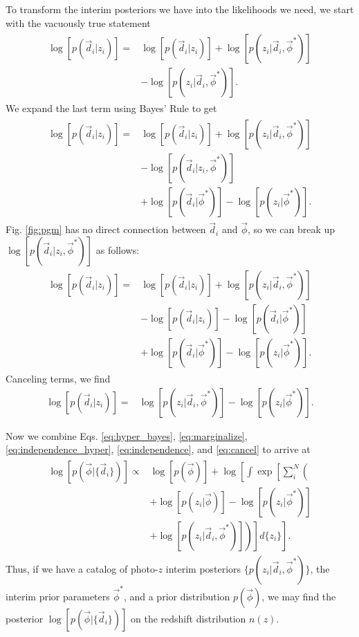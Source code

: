 \documentclass[iop]{emulateapj}
\begin{document}
To transform the interim posteriors we have into the likelihoods we need, we 
start with the vacuously true statement
\begin{align}
\begin{split}
\label{eq:unity}
\log[p(\vec{d}_{i} | z_{i})] =& \log[p(\vec{d}_{i} | z_{i})] + \log[p(z_{i} | 
\vec{d}_{i}, \vec{\phi}^{*})]\\
& - \log[p(z_{i} | \vec{d}_{i}, \vec{\phi}^{*})].
\end{split}
\end{align}
We expand the last term using Bayes' Rule to get
\begin{align}
\begin{split}
\label{eq:bayes}
\log[p(\vec{d}_{i} | z_{i})] =& \log[p(\vec{d}_{i} | z_{i})] + \log[p(z_{i} | 
\vec{d}_{i}, \vec{\phi}^{*})]\\
& - \log[p(\vec{d}_{i} | z_{i}, \vec{\phi}^{*})]\\
& + \log[p(\vec{d}_{i} | \vec{\phi}^{*})] - \log[p(z_{i} | \vec{\phi}^{*})].
\end{split}
\end{align}
Fig. \ref{fig:pgm} has no direct connection between $\vec{d}_{i}$ and 
$\vec{\phi}$, so we can break up $\log[p(\vec{d}_{i} | z_{i}, \vec{\phi}^{*})]$ 
as follows:
\begin{align}
\begin{split}
\label{eq:split}
\log[p(\vec{d}_{i} | z_{i})] =& \log[p(\vec{d}_{i} | z_{i})] + \log[p(z_{i} | 
\vec{d}_{i}, \vec{\phi}^{*})]\\
& - \log[p(\vec{d}_{i} | z_{i})] - \log[p(\vec{d}_{i} | \vec{\phi}^{*})]\\
& + \log[p(\vec{d}_{i} | \vec{\phi}^{*})] - \log[p(z_{i} | \vec{\phi}^{*})].
\end{split}
\end{align}
Canceling terms, we find
\begin{align}
\label{eq:cancel}
\log[p(\vec{d}_{i} | z_{i})] =& \log[p(z_{i} | \vec{d}_{i}, \vec{\phi}^{*})] - 
\log[p(z_{i} | \vec{\phi}^{*})].
\end{align}

Now we combine Eqs. \ref{eq:hyper_bayes}, \ref{eq:marginalize}, 
\ref{eq:independence_hyper}, \ref{eq:independence}, and \ref{eq:cancel} to 
arrive at 
\begin{align}
\begin{split}
\label{eq:final}
\log[p(\vec{\phi} | \{\vec{d}_{i}\})] \propto& \log[p(\vec{\phi})] + 
\log\left[\int \exp\left[\sum_{i}^{N} \left(\right.\right.\right.\\
& \left.\left.\left. + \log[p(z_{i} | \vec{\phi})] - \log[p(z_{i} | 
\vec{\phi}^{*})]\right.\right.\right.\\
& \left.\left.\left. + \log[p(z_{i} | \vec{d}_{i}, \vec{\phi}^{*})]
\right)\right] d\{z_{i}\}\right].
\end{split}
\end{align}
Thus, if we have a catalog of photo-$z$ interim posteriors $\{p(z_{i} | 
\vec{d}_{i}, \vec{\phi}^{*})\}$, the interim prior parameters $\vec{\phi}^{*}$, 
and a prior distribution $p(\vec{\phi})$, we may find the posterior 
$\log[p(\vec{\phi} | \{\vec{d}_{i}\})]$ on the redshift distribution $n(z)$.
\end{document}
